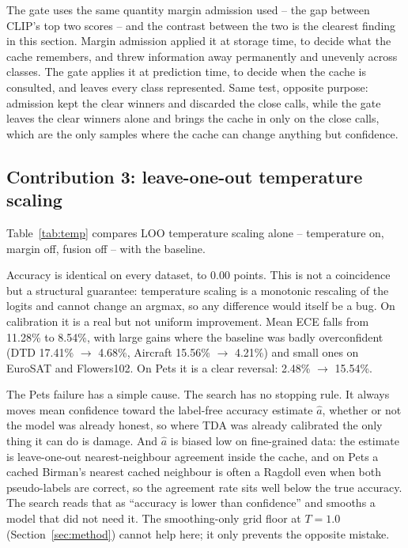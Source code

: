 The gate uses the same quantity margin admission used -- the gap between CLIP's top two
scores -- and the contrast between the two is the clearest finding in this section. Margin
admission applied it at storage time, to decide what the cache remembers, and threw information
away permanently and unevenly across classes. The gate applies it at prediction time, to decide
when the cache is consulted, and leaves every class represented. Same test, opposite purpose:
admission kept the clear winners and discarded the close calls, while the gate leaves the clear
winners alone and brings the cache in only on the close calls, which are the only samples where
the cache can change anything but confidence.

\subsection{Contribution 3: leave-one-out temperature scaling}
\label{sec:temperature}

Table~\ref{tab:temp} compares LOO temperature scaling alone -- temperature on, margin off,
fusion off -- with the baseline.



Accuracy is identical on every dataset, to 0.00 points. This is not a coincidence but a
structural guarantee: temperature scaling is a monotonic rescaling of the logits and cannot
change an argmax, so any difference would itself be a bug. On calibration it is a real but not
uniform improvement. Mean ECE falls from 11.28\% to 8.54\%, with large gains where the baseline
was badly overconfident (DTD 17.41\% $\rightarrow$ 4.68\%, Aircraft 15.56\% $\rightarrow$
4.21\%) and small ones on EuroSAT and Flowers102. On Pets it is a clear reversal: 2.48\%
$\rightarrow$ 15.54\%.

The Pets failure has a simple cause. The search has no stopping rule. It always moves mean
confidence toward the label-free accuracy estimate $\hat{a}$, whether or not the model was
already honest, so where TDA was already calibrated the only thing it can do is damage. And
$\hat{a}$ is biased low on fine-grained data: the estimate is leave-one-out nearest-neighbour
agreement inside the cache, and on Pets a cached Birman's nearest cached neighbour is often a
Ragdoll even when both pseudo-labels are correct, so the agreement rate sits well below the
true accuracy. The search reads that as ``accuracy is lower than confidence'' and smooths a model
that did not need it. The smoothing-only grid floor at $T = 1.0$ (Section~\ref{sec:method})
cannot help here; it only prevents the opposite mistake.

